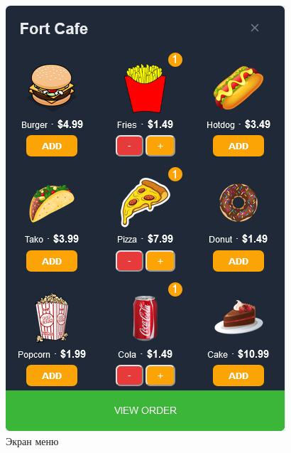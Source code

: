 {{\begin{figure}[H]
\begin{minipage}{0.45\textwidth}
                \includegraphics[width=\textwidth]{assets/menu.png}
                \caption{Экран меню}
                \label{fig:login_page}
            \end{minipage}
            \hfill
            \begin{minipage}{0.45\textwidth}
                \centering

\end{minipage}
\end{figure}}}
